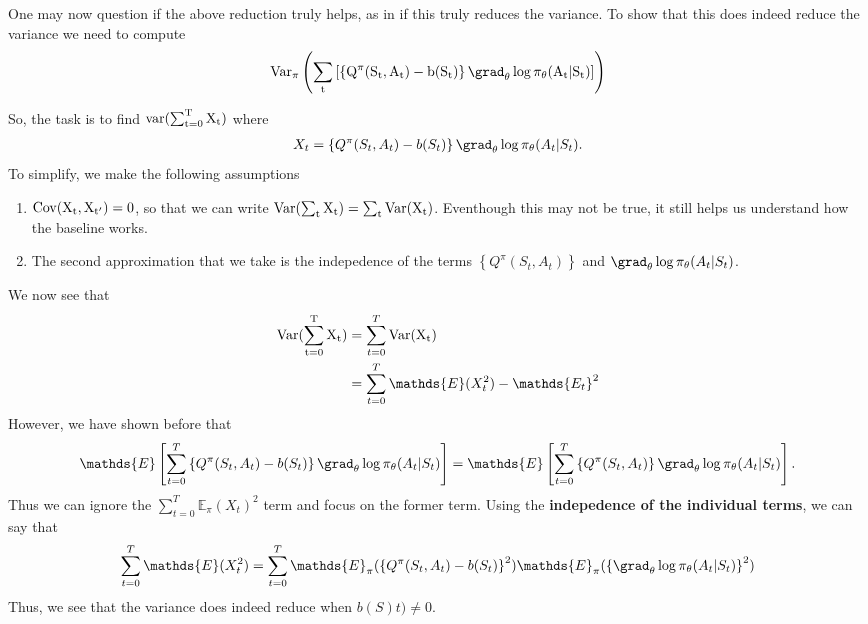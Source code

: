 One may now question if the above reduction truly helps, as in if this truly reduces the variance. To show that this does indeed reduce the variance we need to compute  
\begin{align}
    \rm{Var}_{\pi}\left(\sum_{t}\left[ \left\{Q^{\pi}(S_t,A_t)-b(S_t)\right\} \grad_{\theta}\log \pi_{\theta}(A_t|S_t)\right]\right)
\end{align}
\begin{tcolorbox}[title= Proof of the variance reduction, breakable]
    So, the task is to find $\rm{var}(\sum^T_{t=0} X_t)$ where 
    \begin{align}
        X_t =  \left\{Q^{\pi}(S_t,A_t)-b(S_t)\right\} \grad_{\theta}\log \pi_{\theta}(A_t|S_t).
    \end{align}
    To simplify, we make the following assumptions~\cite{daniel_takeshi:RL_GoingDeeper}
    \begin{enumerate}
        \item $\rm{Cov}(X_t,X_{t'})=0$, so that we can write 
            $\rm{Var}(\sum_{t} X_t) = \sum_{t}\rm{Var}( X_t)$. Eventhough this may not be true, it still helps us understand how the baseline works.
        \item The second approximation that we take is the indepedence of the terms $\left\{Q^{\pi}(S_t,A_t)\right\}$ and $\grad_{\theta}\log \pi_{\theta}(A_t|S_t)$.
    \end{enumerate}    
    We now see that 
    \begin{align}
        \rm{Var}(\sum^T_{t=0}X_t) &= \sum^T_{t=0} \rm{Var}(X_t)\\
        &=\sum^T_{t=0} \mathds{E}(X^2_t) - \mathds{E_t}^2
    \end{align}
    However, we have shown before that 
    \begin{align}
        \mathds{E}\left[\sum^T_{t=0}\left\{Q^{\pi}(S_t,A_t)-b(S_t)\right\} \grad_{\theta}\log \pi_{\theta}(A_t|S_t)\right] = \mathds{E}\left[\sum^T_{t=0}\left\{Q^{\pi}(S_t,A_t)\right\} \grad_{\theta}\log \pi_{\theta}(A_t|S_t)\right].
    \end{align}
    Thus we can ignore the $\sum^T_{t=0}\mathds{E}_{\pi}(X_t)^2$ term and focus on the former term. Using the \textbf{indepedence of the individual terms}, we can say that  
    \begin{align}
        \sum^T_{t=0} \mathds{E}(X^2_t) = \sum^T_{t=0} \mathds{E}_{\pi}(\left\{Q^{\pi}(S_t,A_t)-b(S_t)\right\}^2)\mathds{E}_{\pi}(\left\{\grad_{\theta}\log \pi_{\theta}(A_t|S_t)\right\}^2)
    \end{align}
    Thus, we see that the variance does indeed reduce when $b(S)t)\neq 0$.
\end{tcolorbox}

